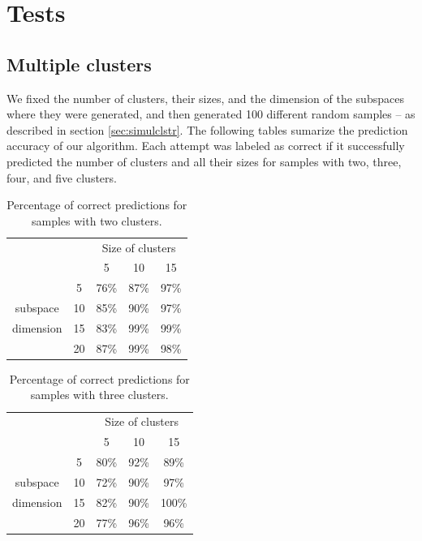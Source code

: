 \documentclass[12pt]{article}
\begin{document}
\section{Tests}
\subsection{Multiple clusters}
We fixed the number of clusters, their sizes, and the dimension of the subspaces where they were generated, and then generated 100 different random samples -- as described in section \ref{sec:simulclstr}. The following tables sumarize the prediction accuracy of our algorithm. Each attempt was labeled as correct if it successfully predicted the number of clusters and all their sizes for samples with two, three, four, and five clusters.

\begin{table}[H]
\begin{center}
	\begin{tabular}{cc|c|c|c|}
		\cline{3-5}
		& & \multicolumn{3}{c|}{Size of clusters} \\ 
		\cline{3-5}
		& & 5 & 10 & 15 \\
		\hline
		\multicolumn{1}{|c}{} & 
		\multicolumn{1}{|c|}{5} & 76\% & 87\%& 97\%	 	\\ \cline{2-5}
		\multicolumn{1}{|c}{ subspace} & 
		\multicolumn{1}{|c|}{10} & 85\% & 90\%& 97\% 	\\ \cline{2-5}
		\multicolumn{1}{|c}{ dimension} & 
		\multicolumn{1}{|c|}{15} & 83\% & 99\%& 99\% 	\\ \cline{2-5}
		\multicolumn{1}{|c}{} & 
		\multicolumn{1}{|c|}{20} & 87\% & 99\%& 98\% 	\\ \cline{1-5}
	\end{tabular}
	\caption{Percentage of correct predictions for samples with two clusters.}
	\end{center}
\end{table}

\begin{table}[H]
\begin{center}
	\begin{tabular}{cc|c|c|c|}
		\cline{3-5}
		& & \multicolumn{3}{c|}{Size of clusters} \\ 
		\cline{3-5}
		& & 5 & 10 & 15 \\
		\hline
		\multicolumn{1}{|c}{} & 
		\multicolumn{1}{|c|}{5} & 80\% & 92\%& 89\%	 	\\ \cline{2-5}
		\multicolumn{1}{|c}{ subspace} & 
		\multicolumn{1}{|c|}{10} & 72\% & 90\%& 97\% 	\\ \cline{2-5}
		\multicolumn{1}{|c}{ dimension} & 
		\multicolumn{1}{|c|}{15} & 82\% & 90\%& 100\% 	\\ \cline{2-5}
		\multicolumn{1}{|c}{} & 
		\multicolumn{1}{|c|}{20} & 77\% & 96\%& 96\% 	\\ \cline{1-5}
	\end{tabular}
	\caption{Percentage of correct predictions for samples with three clusters.}
\end{center}
\end{table}
\end{document}
